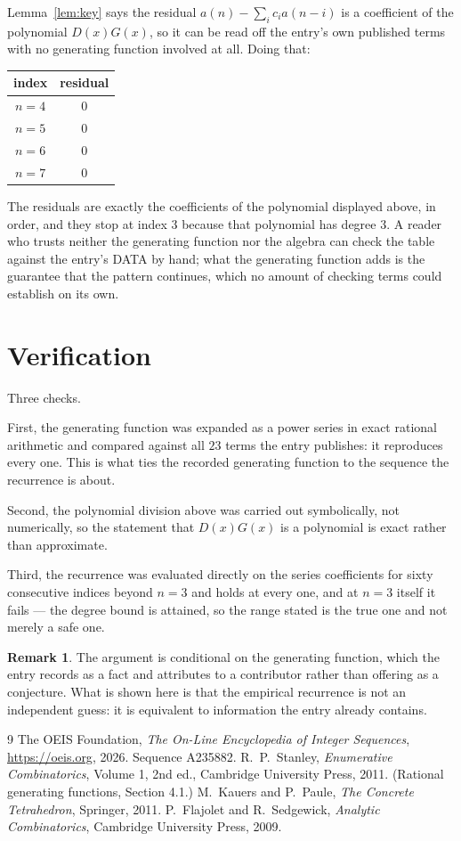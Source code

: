 \documentclass[11pt,a4paper]{article}
\theoremstyle{plain}
\theoremstyle{definition}
\newtheorem{remark}[theorem]{Remark}
\begin{document}
Lemma~\ref{lem:key} says the residual $a(n)-\sum_ic_ia(n-i)$ is a coefficient of the
polynomial $D(x)G(x)$, so it can be read off the entry's own published terms with no
generating function involved at all. Doing that:
\begin{center}
\begin{tabular}{cc}
index & residual \\ \hline
$n=4$ & $0$ \\
$n=5$ & $0$ \\
$n=6$ & $0$ \\
$n=7$ & $0$
\end{tabular}
\end{center}
The residuals are exactly the coefficients of the polynomial displayed above, in order, and
they stop at index $3$ because that polynomial has degree $3$. A reader who trusts
neither the generating function nor the algebra can check the table against the entry's DATA
by hand; what the generating function adds is the guarantee that the pattern continues, which
no amount of checking terms could establish on its own.

\section{Verification}

Three checks.

First, the generating function was expanded as a power series in exact rational arithmetic and
compared against all $23$ terms the entry publishes: it reproduces every one. This is
what ties the recorded generating function to the sequence the recurrence is about.

Second, the polynomial division above was carried out symbolically, not numerically, so the
statement that $D(x)G(x)$ is a polynomial is exact rather than approximate.

Third, the recurrence was evaluated directly on the series coefficients for sixty consecutive
indices beyond $n=3$ and holds at every one, and at $n=3$ itself it fails --- the
degree bound is attained, so the range stated is the true one and not merely a safe one.

\begin{remark}
The argument is conditional on the generating function, which the entry records as a fact and
attributes to a contributor rather than offering as a conjecture. What is shown here is that
the empirical recurrence is not an independent guess: it is equivalent to information the
entry already contains.
\end{remark}

\begin{thebibliography}{9}
 The OEIS Foundation, \emph{The On-Line Encyclopedia of Integer
Sequences}, \url{https://oeis.org}, 2026. Sequence A235882.
 R.~P.~Stanley, \emph{Enumerative Combinatorics}, Volume 1, 2nd ed.,
Cambridge University Press, 2011. (Rational generating functions, Section 4.1.)
 M.~Kauers and P.~Paule, \emph{The Concrete Tetrahedron}, Springer, 2011.
 P.~Flajolet and R.~Sedgewick, \emph{Analytic Combinatorics}, Cambridge
University Press, 2009.
\end{thebibliography}
\end{document}
